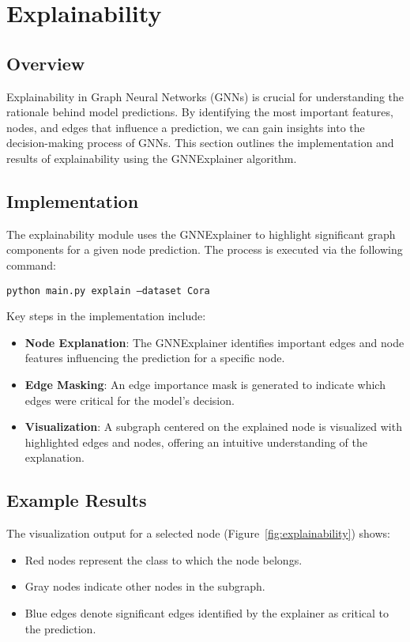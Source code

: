 	\newpage
	\section{Explainability}
	
	\subsection{Overview}
	Explainability in Graph Neural Networks (GNNs) is crucial for understanding the rationale behind model predictions. By identifying the most important features, nodes, and edges that influence a prediction, we can gain insights into the decision-making process of GNNs. This section outlines the implementation and results of explainability using the GNNExplainer algorithm.
	
	\subsection{Implementation}
	The explainability module uses the GNNExplainer to highlight significant graph components for a given node prediction. The process is executed via the following command:
	\begin{tcolorbox}
		\texttt{python main.py explain --dataset Cora}
	\end{tcolorbox}
	
	Key steps in the implementation include:
	\begin{itemize}
		\item \textbf{Node Explanation}: The GNNExplainer identifies important edges and node features influencing the prediction for a specific node.
		\item \textbf{Edge Masking}: An edge importance mask is generated to indicate which edges were critical for the model's decision.
		\item \textbf{Visualization}: A subgraph centered on the explained node is visualized with highlighted edges and nodes, offering an intuitive understanding of the explanation.
	\end{itemize}
	
	\subsection{Example Results}
	The visualization output for a selected node (Figure~\ref{fig:explainability}) shows:
	\begin{itemize}
		\item Red nodes represent the class to which the node belongs.
		\item Gray nodes indicate other nodes in the subgraph.
		\item Blue edges denote significant edges identified by the explainer as critical to the prediction.
	\end{itemize}
	
